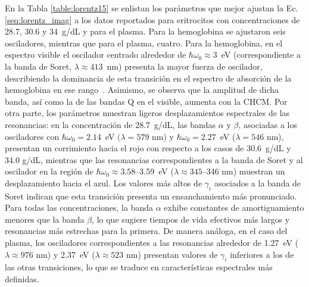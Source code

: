 En la Tabla \ref{table:lorentz15} se enlistan los parámetros que mejor ajustan la Ec. \ref{seq:lorentz_imag} a los datos reportados para eritrocitos con concentraciones de 28.7, 30.6 y 34~g/dL y para el plasma. Para la hemoglobina se ajustaron seis osciladores, mientras que para el plasma, cuatro. Para la hemoglobina, en el espectro visible el oscilador centrado alrededor de $\hbar\omega_{0}\approx 3$~eV (correspondiente a la banda de Soret, $\lambda\approx 413$~nm) presenta la mayor fuerza de oscilador, describiendo la dominancia de esta transición en el espectro de absorción de la hemoglobina en ese rango~\cite{bosschaartLiteratureReviewNovel2014}. Asimismo, se observa que la amplitud de dicha banda, así como la de las bandas Q en el visible, aumenta con la CHCM. Por otra parte, los parámetros muestran ligeros desplazamientos espectrales de las resonancias: en la concentración de 28.7~g/dL, las bandas $\alpha$ y $\beta$, asociadas a los osciladores con $\hbar\omega_{0}= 2.14$~eV $(\lambda=579$ nm) y $\hbar\omega_{0}=2.27$~eV ($\lambda= 546$ nm), presentan un corrimiento hacia el rojo con respecto a los casos de 30.6~g/dL y 34.0 g/dL, mientras que las resonancias correspondientes a la banda de Soret y al oscilador en la región de $\hbar\omega_{0}\approx 3.58$--3.59~eV ($\lambda\approx 345$--346 nm) muestran un desplazamiento hacia el azul. Los valores más altos de $\gamma_i$ asociados a la banda de Soret indican que esta transición presenta un ensanchamiento más pronunciado. Para todas las concentraciones, la banda $\alpha$ exhibe constantes de amortiguamiento menores que la banda $\beta$, lo que sugiere tiempos de vida efectivos más largos y resonancias más estrechas para la primera. De manera análoga, en el caso del plasma, los osciladores correspondientes a las resonancias alrededor de 1.27~eV ($\lambda\approx 976$ nm) y 2.37~eV ($\lambda\approx 523$ nm) presentan valores de $\gamma_i$ inferiores a los de las otras transiciones, lo que se traduce en características espectrales más definidas.
%
\vspace{1cm}
	

